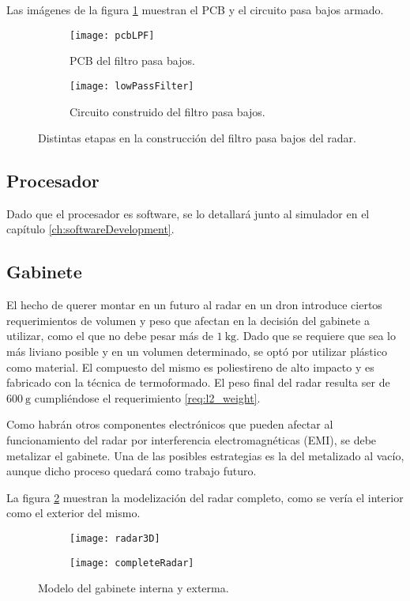 Las imágenes de la figura \ref{fig:lowPassFilterCircuit} muestran el PCB y el circuito pasa bajos armado.
\begin{figure}[H]
  \centering
  \begin{subfigure}[b]{0.47\textwidth}
    \texttt{[image: pcbLPF]}
    \caption{PCB del filtro pasa bajos.}
  \end{subfigure}
  \begin{subfigure}[b]{0.47\textwidth}
    \texttt{[image: lowPassFilter]}
    \caption{Circuito construido del filtro pasa bajos.}
  \end{subfigure}
  \caption{Distintas etapas en la construcción del filtro pasa bajos del radar.}
  \label{fig:lowPassFilterCircuit}
\end{figure}


\subsection{Procesador}

Dado que el procesador es software, se lo detallará junto al simulador en el capítulo \ref{ch:softwareDevelopment}.

\subsection{Gabinete}

El hecho de querer montar en un futuro al radar en un dron introduce ciertos requerimientos de volumen y peso que afectan en la decisión del gabinete a utilizar, como el que no debe pesar más de $\SI{1}{\kg}$. Dado que se requiere que sea lo más liviano posible y en un volumen determinado, se optó por utilizar plástico como material. El compuesto del mismo es poliestireno de alto impacto y es fabricado con la técnica de termoformado. El peso final del radar resulta ser de $\SI{600}{\gram}$ cumpliéndose el requerimiento \ref{req:l2_weight}.

Como habrán otros componentes electrónicos que pueden afectar al funcionamiento del radar por interferencia electromagnéticas (EMI), se debe metalizar el gabinete. Una de las posibles estrategias es la del metalizado al vacío, aunque dicho proceso quedará como trabajo futuro.

La figura \ref{fig:radar3D} muestran la modelización del radar completo, como se vería el interior como el exterior del mismo.
\begin{figure}[H]
 \centering
 \begin{subfigure}[t]{0.49\textwidth}
    \texttt{[image: radar3D]}
  \end{subfigure}
  \begin{subfigure}[t]{0.49\textwidth}
    \texttt{[image: completeRadar]}
  \end{subfigure}
 \caption{Modelo del gabinete interna y exterma.}
 \label{fig:radar3D}
\end{figure}

